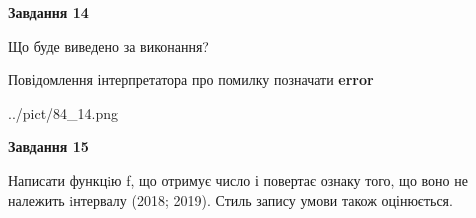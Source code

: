 \documentclass[11pt, ukrainian]{article}
\begin{document}
{\begin {large}
{\begin {center}\textbf{Завдання 14}\end {center}}\par
Що буде виведено за виконання? \par
Повідомлення інтерпретатора про помилку позначати \textbf{error}

\begin{center}
	{../pict/84_14.png}
\end{center}
\newpage

{\begin {center}\textbf{Завдання 15}\end {center}}\par

Написати функцiю f, що отримує число і повертає ознаку того, що воно не належить iнтервалу (2018; 2019). Стиль запису умови також оцінюється.\par
\newpage

\end {large}}
\end{document}
